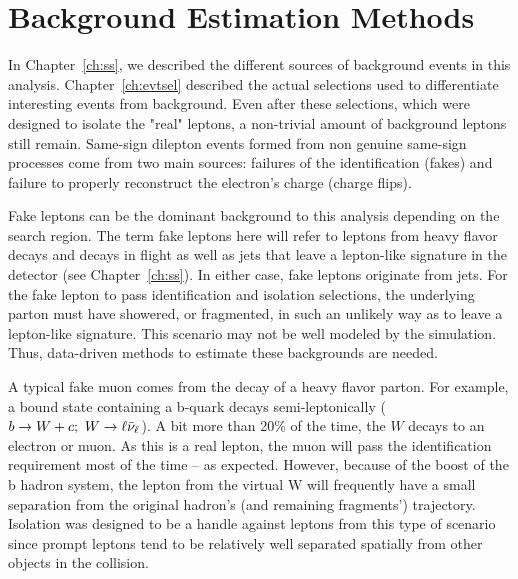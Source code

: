 \chapter{Background Estimation Methods}
\label {ch:bkgd}
In Chapter~\ref{ch:ss}, we described the different sources of background events
in this analysis. Chapter~\ref{ch:evtsel} described the actual selections
used to differentiate interesting events from background. Even after these
selections, which were designed to isolate the "real" leptons, a non-trivial
amount of background leptons still remain. Same-sign dilepton events
formed from non genuine same-sign processes come from two main
sources: failures of the identification (fakes) and failure to properly
reconstruct the electron's charge (charge flips).

Fake leptons can be the dominant background to this analysis depending on the
search region. The term fake leptons here will refer to leptons from heavy
flavor decays and decays in flight as well as jets that leave a lepton-like
signature in the detector (see Chapter~\ref{ch:ss}). In either case, fake
leptons originate from jets. For the fake lepton to pass identification and
isolation selections, the underlying parton must have showered, or fragmented,
in such an unlikely way as to leave a lepton-like signature. This scenario may
not be well modeled by the simulation. Thus, data-driven methods to estimate
these backgrounds are needed.

A typical fake muon comes from the decay of a heavy flavor parton. For example,
a bound state containing a b-quark decays semi-leptonically ($b \to W +
c;\ \relax{W} \to \ell\bar{\nu}_{\ell}$). A bit more than 20\% of the time, the $W$ decays to an electron
or muon. As this is a real lepton, the muon will pass the identification
requirement most of the time -- as expected. However, because of the boost of
the b hadron system, the lepton from the virtual W will frequently have a small
separation from the original hadron's (and remaining fragments') trajectory.
Isolation was designed to be a handle against leptons from this type of scenario
since prompt leptons tend to be relatively well separated spatially from other
objects in the collision.

